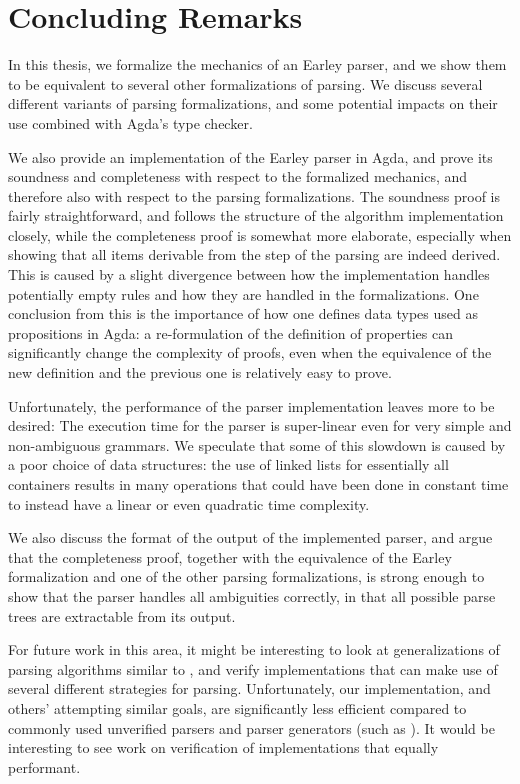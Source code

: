 \chapter{Concluding Remarks}\label{Conclusion}

	In this thesis, we formalize the mechanics of an Earley parser, and we show
	them to be equivalent to several other formalizations of parsing. We
	discuss several different variants of parsing formalizations, and some
	potential impacts on their use combined with Agda's type checker.

	We also provide an implementation of the Earley parser in Agda, and prove
	its soundness and completeness with respect to the formalized mechanics,
	and therefore also with respect to the parsing formalizations. The
	soundness proof is fairly straightforward, and follows the structure of the
	algorithm implementation closely, while the completeness proof is somewhat
	more elaborate, especially when showing that all items derivable from the
	 step of the parsing are indeed derived. This is caused by
	a slight divergence between how the implementation handles potentially
	empty rules and how they are handled in the formalizations. One conclusion
	from this is the importance of how one defines data types used as
	propositions in Agda: a re-formulation of the definition of properties can
	significantly change the complexity of proofs, even when the equivalence of
	the new definition and the previous one is relatively easy to prove.

	Unfortunately, the performance of the parser implementation leaves more to
	be desired: The execution time for the parser is super-linear even for very
	simple and non-ambiguous grammars. We speculate that some of this slowdown
	is caused by a poor choice of data structures: the use of linked lists for
	essentially all containers results in many operations that could have been
	done in constant time to instead have a linear or even quadratic time 
	complexity.

	We also discuss the format of the output of the implemented parser, and
	argue that the completeness proof, together with the equivalence of the
	Earley formalization and one of the other parsing formalizations, is strong
	enough to show that the parser handles all ambiguities correctly, in that
	all possible parse trees are extractable from its output.

	For future work in this area, it might be interesting to look at
	generalizations of parsing algorithms similar to \cite{sikkel97}, and
	verify implementations that can make use of several different strategies
	for parsing. Unfortunately, our implementation, and others' attempting
	similar goals, are significantly less efficient compared to commonly used
	unverified parsers and parser generators (such as \cite{Menhir, Happy,
	Bison}). It would be interesting to see work on verification of
	implementations that equally performant.
